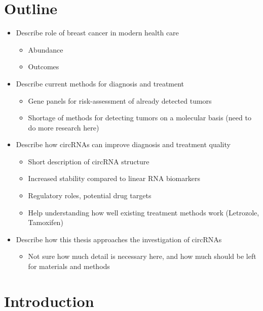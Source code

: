 \section{Outline}

\begin{itemize}
    \item Describe role of breast cancer in modern health care
          \begin{itemize}
              \item Abundance
              \item Outcomes
          \end{itemize}
    \item Describe current methods for diagnosis and treatment
          \begin{itemize}
              \item Gene panels for risk-assessment of already detected tumors
              \item Shortage of methods for detecting tumors on a molecular basis
                    (need to do more research here)
          \end{itemize}
    \item Describe how circRNAs can improve diagnosis and treatment quality
          \begin{itemize}
              \item Short description of circRNA structure
              \item Increased stability compared to linear RNA biomarkers
              \item Regulatory roles, potential drug targets
              \item Help understanding how well existing treatment methods work
                    (Letrozole, Tamoxifen)
          \end{itemize}
    \item Describe how this thesis approaches the investigation of circRNAs
          \begin{itemize}
              \item Not sure how much detail is necessary here, and how much should
                    be left for materials and methods
          \end{itemize}
\end{itemize}

\section{Introduction}

\lipsum[1-10]